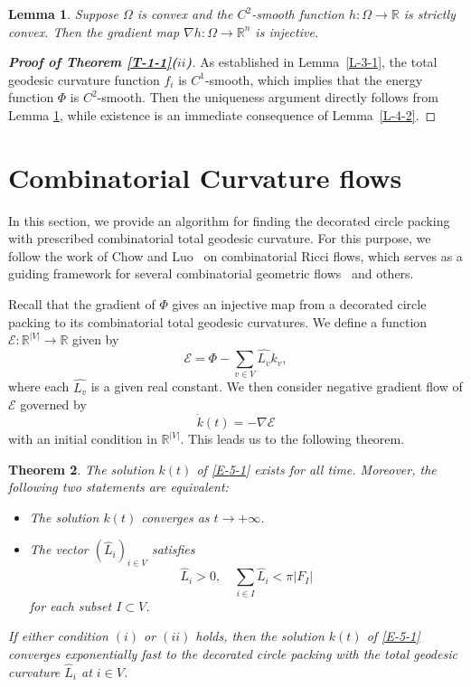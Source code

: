 \documentclass[11pt,leqno]{article}
\numberwithin{equation}{section}
\newtheorem{theorem}{Theorem}[section]
\newtheorem{lemma}[theorem]{Lemma}
\theoremstyle{definition}
\begin{document}
\begin{lemma}\label{L-4-3}
Suppose $\Omega$ is convex and the $C^2$-smooth function $h:\Omega\to\mathbb{R}$ is strictly convex. Then the gradient map $\nabla h:\Omega\to\mathbb{R}^n$ is injective.
\end{lemma}

\begin{proof}[\textbf{Proof of Theorem \ref{T-1-1}($ii$)}]
As established in Lemma~\ref{L-3-1}, the total geodesic curvature function $f_i$ is $C^1$-smooth, which implies that the energy function $\Phi$ is $C^2$-smooth. Then the uniqueness argument directly follows from Lemma \ref{L-4-3}, while existence is an immediate consequence of Lemma~\ref{L-4-2}.


\end{proof}


\section{Combinatorial Curvature flows}

In this section, we provide an algorithm for finding the decorated circle packing with prescribed combinatorial total geodesic curvature.
For this purpose, we follow the work of Chow and Luo~\cite{MR2015261} on combinatorial Ricci flows, which serves as a guiding framework for several combinatorial geometric flows~\cite{MR2100762,MR3729504,MR4024610,MR3914484,MR4466650} and others.

Recall that the gradient of $\Phi$ gives an injective map from a decorated circle packing to its combinatorial total geodesic curvatures.
We define a function $\mathcal E:\mathbb{R}^{|V|}\to\mathbb{R}$ given by
\[\mathcal E=\Phi-\sum_{v\in V}\hat{L_v}k_v,\]
where each $\hat{L_v}$ is a given real constant. We then consider negative gradient flow of $\mathcal E$ governed by
\begin{equation}\label{E-5-1}
\dot k(t)=-\nabla\mathcal E
\end{equation}
with an initial condition in $\mathbb{R}^{\vert V\vert}$. This leads us to the following theorem.
\begin{theorem}\label{T-5-1}
The solution $k(t)$ of \eqref{E-5-1} exists for all time. Moreover, the following two statements are equivalent:
\begin{itemize}
\item[($i$)] The solution $k(t)$ converges as $t\to+\infty$.
\item[($ii$)] The vector $(\hat{L}_i)_{i\in V}$ satisfies \[\hat{L}_i>0,\quad\sum_{i\in I}\hat{L}_i<\pi\vert F_I\vert\]
for each subset $I\subset V$.

\end{itemize}
If either condition $(i)$ or $(ii)$ holds, then the solution $k(t)$ of \eqref{E-5-1} converges exponentially fast to the decorated circle packing with the total geodesic curvature $\hat{L}_{i}$ at $i\in V$.
\end{theorem}
\end{document}
